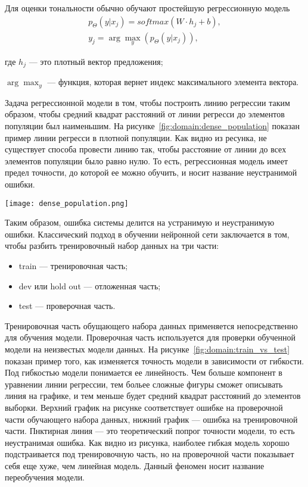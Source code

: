 Для оценки тональности обычно обучают простейшую регрессионную модель
\begin{gather}
  p_{\Theta}(y|x_j) = softmax(W\cdot{h_j} + b),\\
  y_j = \arg \max_y(p_{\Theta}(y|x_j)),
\end{gather}
\begin{explanationx}
\item[где] $h_j$ --- это плотный вектор предложения;
\item$\arg \max_y$ --- функция, которая вернет индекс максимального элемента вектора.
\end{explanationx}

Задача регрессионной модели в том, чтобы построить линию регрессии таким образом, чтобы средний квадрат расстояний от линии регресси до элементов популяции был наименьшим. На рисунке~\ref{fig:domain:dense_population} показан пример линии регресси в плотной популяции. Как видно из ресунка, не существует способа провести линию так, чтобы расстояние от линии до всех элементов популяции было равно нулю. То есть, регрессионная модель имеет предел точности, до которой ее можно обучить, и носит название неустранимой ошибки.

\begin{center}
  \texttt{[image: dense\_population.png]}
  \label{fig:domain:dense_population}
\end{center}

Таким образом, ошибка системы делится на устранимую и неустранимую ошибки. Классический подход в обучении нейронной сети заключается в том, чтобы разбить тренировочный набор данных на три части:
\begin{itemize}
\item train --- тренировочная часть;
\item dev или hold out --- отложенная часть;
\item test --- проверочная часть.
\end{itemize}

Тренировочная часть обущающего набора данных применяется непосредственно для обучения модели. Проверочная часть используется для проверки обученной модели на неизвестых модели данных. На рисунке~\ref{fig:domain:train_vs_test} показан пример того, как изменяется точность модели в зависимости от гибкости. Под гибкостью модели понимается ее линейность. Чем больше компонент в уравнении линии регрессии, тем больее сложные фигуры сможет описывать линия на графике, и тем меньше будет средний квадрат расстояний до элементов выборки. Верхний график на рисунке соответствует ошибке на проверочной части обучающего набора данных, нижний график --- ошибка на тренировочной части. Пнктирная линия --- это теоретический попрог точности модели, то есть неустранимая ошибка. Как видно из рисунка, наиболее гибкая модель хорошо подстраивается под тренировочную часть, но на проверочной части показывает себя еще хуже, чем линейная модель. Данный феномен носит название переобучения модели.

